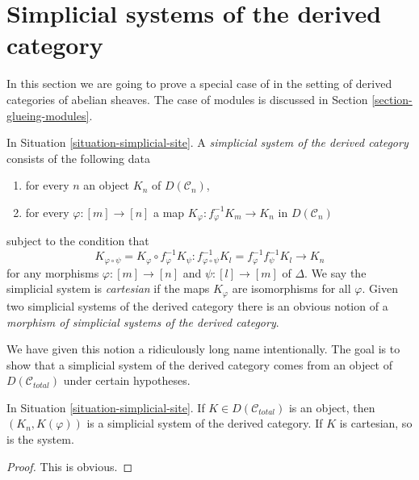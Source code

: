 \section{Simplicial systems of the derived category}
\label{section-glueing}

\noindent
In this section we are going to prove a special case of
\cite[Proposition 3.2.9]{BBD} in the setting of derived
categories of abelian sheaves. The case of modules
is discussed in Section \ref{section-glueing-modules}.

\begin{definition}
\label{definition-cartesian-derived}
In Situation \ref{situation-simplicial-site}. A
{\it simplicial system of the derived category}
consists of the following data
\begin{enumerate}
\item for every $n$ an object $K_n$ of $D(\mathcal{C}_n)$,
\item for every $\varphi : [m] \to [n]$ a map
$K_\varphi : f_\varphi^{-1}K_m \to K_n$ in $D(\mathcal{C}_n)$
\end{enumerate}
subject to the condition that
$$
K_{\varphi \circ \psi} = K_\varphi \circ f_\varphi^{-1}K_\psi :
f_{\varphi \circ \psi}^{-1}K_l = f_\varphi^{-1} f_\psi^{-1}K_l
\longrightarrow
K_n
$$
for any morphisms $\varphi : [m] \to [n]$ and $\psi : [l] \to [m]$ of $\Delta$.
We say the simplicial system is {\it cartesian} if the maps $K_\varphi$
are isomorphisms for all $\varphi$.
Given two simplicial systems of the derived category
there is an obvious notion of a
{\it morphism of simplicial systems of the derived category}.
\end{definition}

\noindent
We have given this notion a ridiculously long name intentionally.
The goal is to show that a simplicial system of the derived category
comes from an object of $D(\mathcal{C}_{total})$ under certain
hypotheses.

\begin{lemma}
\label{lemma-cartesian-objects-derived}
In Situation \ref{situation-simplicial-site}.
If $K \in D(\mathcal{C}_{total})$ is an object,
then $(K_n, K(\varphi))$ is a simplicial system of the derived category.
If $K$ is cartesian, so is the system.
\end{lemma}

\begin{proof}
This is obvious.
\end{proof}

